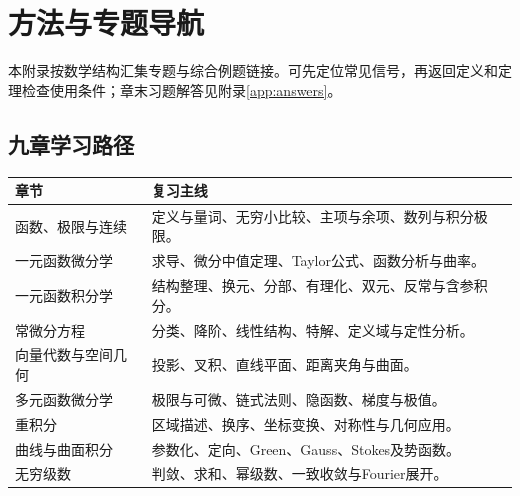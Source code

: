 \chapter{方法与专题导航}\label{app:materials}
本附录按数学结构汇集专题与综合例题链接。可先定位常见信号，再返回定义和定理检查使用条件；章末习题解答见附录\ref{app:answers}。
\section{九章学习路径}
\begin{longtable}{p{36mm}p{88mm}}\toprule 章节&复习主线\\\midrule\endhead
函数、极限与连续&定义与量词、无穷小比较、主项与余项、数列与积分极限。\\
一元函数微分学&求导、微分中值定理、Taylor公式、函数分析与曲率。\\
一元函数积分学&结构整理、换元、分部、有理化、双元、反常与含参积分。\\
常微分方程&分类、降阶、线性结构、特解、定义域与定性分析。\\
向量代数与空间几何&投影、叉积、直线平面、距离夹角与曲面。\\
多元函数微分学&极限与可微、链式法则、隐函数、梯度与极值。\\
重积分&区域描述、换序、坐标变换、对称性与几何应用。\\
曲线与曲面积分&参数化、定向、Green、Gauss、Stokes及势函数。\\
无穷级数&判敛、求和、幂级数、一致收敛与Fourier展开。\\
\bottomrule\end{longtable}

